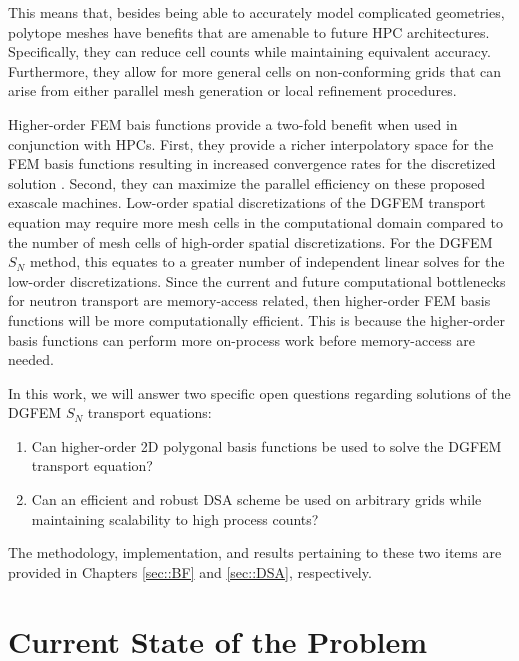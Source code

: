 \noindent This means that, besides being able to accurately model complicated geometries, polytope meshes have benefits that are amenable to future HPC architectures. Specifically, they can reduce cell counts while maintaining equivalent accuracy. Furthermore, they allow for more general cells on non-conforming grids that can arise from either parallel mesh generation or local refinement procedures.

Higher-order FEM bais functions provide a two-fold benefit when used in conjunction with HPCs. First, they provide a richer interpolatory space for the FEM basis functions resulting in increased convergence rates for the discretized solution \cite{ern2013theory}. Second, they can maximize the parallel efficiency on these proposed exascale machines. Low-order spatial discretizations of the DGFEM transport equation may require more mesh cells in the computational domain compared to the number of mesh cells of high-order spatial discretizations. For the DGFEM $S_N$ method, this equates to a greater number of independent linear solves for the low-order discretizations. Since the current and future computational bottlenecks for neutron transport are memory-access related, then higher-order FEM basis functions will be more computationally efficient. This is because the higher-order basis functions can perform more on-process work before memory-access are needed.

In this work, we will answer two specific open questions regarding solutions of the DGFEM $S_N$ transport equations:

\begin{enumerate}
\item Can higher-order 2D polygonal basis functions be used to solve the DGFEM transport equation?
\item Can an efficient and robust DSA scheme be used on arbitrary grids while maintaining scalability to high process counts?
\end{enumerate}

\noindent The methodology, implementation, and results pertaining to these two items are provided in Chapters \ref{sec::BF} and \ref{sec::DSA}, respectively.

\section{Current State of the Problem}
\label{sec::Intro_Past}

